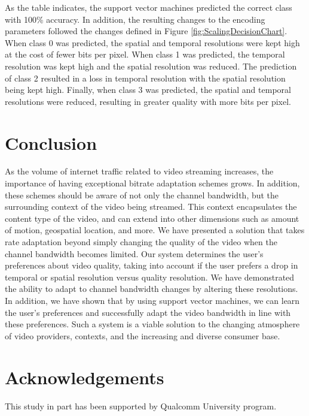 \documentclass[a4paper,12pt]{article}
\begin{document}
As the table indicates, the support vector machines predicted the correct class with 100\% accuracy. In addition, the resulting changes to the encoding parameters followed the changes defined in Figure \ref{fig:ScalingDecisionChart}. When class 0 was predicted, the spatial and temporal resolutions were kept high at the cost of fewer bits per pixel. When class 1 was predicted, the temporal resolution was kept high and the spatial resolution was reduced. The prediction of class 2 resulted in a loss in temporal resolution with the spatial resolution being kept high. Finally, when class 3 was predicted, the spatial and temporal resolutions were reduced, resulting in greater quality with more bits per pixel. 

\section{Conclusion}
\label{sec:Conclusion}
As the volume of internet traffic related to video streaming increases, the importance of having exceptional bitrate adaptation schemes grows. In addition, these schemes should be aware of not only the channel bandwidth, but the surrounding context of the video being streamed. This context encapsulates the content type of the video, and can extend into other dimensions such as amount of motion, geospatial location, and more. We have presented a solution that takes rate adaptation beyond simply changing the quality of the video when the channel bandwidth becomes limited. Our system determines the user’s preferences about video quality, taking into account if the user prefers a drop in temporal or spatial resolution versus quality resolution. We have demonstrated the ability to adapt to channel bandwidth changes by altering these resolutions. In addition, we have shown that by using support vector machines, we can learn the user’s preferences and successfully adapt the video bandwidth in line with these preferences. Such a system is a viable solution to the changing atmosphere of video providers, contexts, and the increasing and diverse consumer base.

\section*{Acknowledgements}
This study in part has been supported by Qualcomm University program. 


{}
\end{document}
